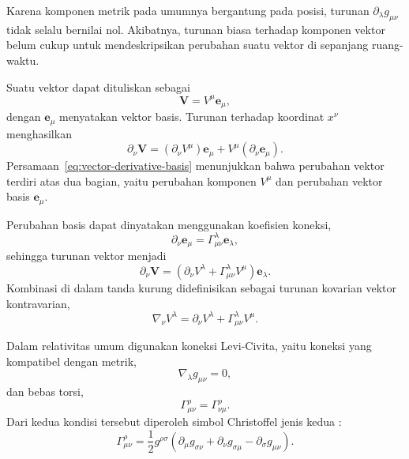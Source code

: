 Karena komponen metrik pada umumnya bergantung pada posisi, turunan
$\partial_\lambda g_{\mu\nu}$ tidak selalu bernilai nol. Akibatnya,
turunan biasa terhadap komponen vektor belum cukup untuk
mendeskripsikan perubahan suatu vektor di sepanjang ruang-waktu.

Suatu vektor dapat dituliskan sebagai
\begin{equation}
    \mathbf{V}=V^\mu\mathbf{e}_\mu,
\end{equation}
dengan $\mathbf{e}_\mu$ menyatakan vektor basis. Turunan terhadap
koordinat $x^\nu$ menghasilkan
\begin{equation}
    \partial_\nu\mathbf{V}
    =
    (\partial_\nu V^\mu)\mathbf{e}_\mu
    +
    V^\mu(\partial_\nu\mathbf{e}_\mu).
    \label{eq:vector-derivative-basis}
\end{equation}
Persamaan~\eqref{eq:vector-derivative-basis} menunjukkan bahwa perubahan
vektor terdiri atas dua bagian, yaitu perubahan komponen $V^\mu$ dan
perubahan vektor basis $\mathbf{e}_\mu$.

Perubahan basis dapat dinyatakan menggunakan koefisien koneksi,
\begin{equation}
    \partial_\nu\mathbf{e}_\mu
    =
    \Gamma^\lambda_{\mu\nu}\mathbf{e}_\lambda,
    \label{eq:basis-connection}
\end{equation}
sehingga turunan vektor menjadi
\begin{equation}
    \partial_\nu\mathbf{V}
    =
    \left(
        \partial_\nu V^\lambda
        +
        \Gamma^\lambda_{\mu\nu}V^\mu
    \right)\mathbf{e}_\lambda.
\end{equation}
Kombinasi di dalam tanda kurung didefinisikan sebagai turunan
kovarian vektor kontravarian,
\begin{equation}
    \nabla_\nu V^\lambda
    =
    \partial_\nu V^\lambda
    +
    \Gamma^\lambda_{\mu\nu}V^\mu.
    \label{eq:covariant-derivative}
\end{equation}

Dalam relativitas umum digunakan koneksi Levi-Civita, yaitu koneksi
yang kompatibel dengan metrik,
\begin{equation}
    \nabla_\lambda g_{\mu\nu}=0,
    \label{eq:metric-compatibility}
\end{equation}
dan bebas torsi,
\begin{equation}
    \Gamma^\rho_{\mu\nu}
    =
    \Gamma^\rho_{\nu\mu}.
    \label{eq:torsion-free}
\end{equation}
Dari kedua kondisi tersebut diperoleh simbol Christoffel jenis kedua
\parencite{Schutz2009FirstCourse,Carroll2004SpacetimeGeometry}:
\begin{equation}
    \Gamma^\rho_{\mu\nu}
    =
    \frac{1}{2}g^{\rho\sigma}
    \left(
        \partial_\mu g_{\sigma\nu}
        +
        \partial_\nu g_{\sigma\mu}
        -
        \partial_\sigma g_{\mu\nu}
    \right).
    \label{eq:christoffel-def}
\end{equation}

